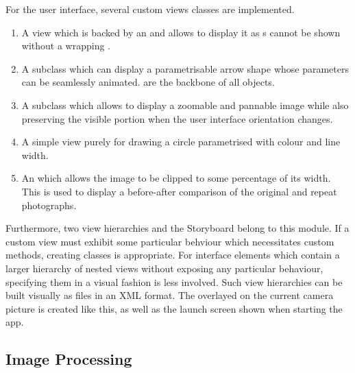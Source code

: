 For the user interface, several custom views classes are implemented.
\begin{enumerate}
   \item {} A view which is backed by an  and
      allows to display it as s cannot be shown without a
      wrapping .
   \item {} A  subclass which can display a
      parametrisable arrow shape whose parameters can be seamlessly animated.
       are the backbone of all  objects.
   \item {} A  subclass which allows to
      display a zoomable and pannable image while also preserving the visible
      portion when the user interface orientation changes.
   \item {} A simple view purely for drawing a circle parametrised
      with colour and line width.
   \item {} An  which allows the
      image to be clipped to some percentage of its width. This is used to
      display a before-after comparison of the original and repeat photographs.
\end{enumerate}

Furthermore, two view hierarchies and the Storyboard belong to this module.  If
a custom view must exhibit some particular behviour which necessitates custom
methods, creating classes is appropriate. For interface elements which contain a
larger hierarchy of nested views without exposing any particular behaviour,
specifying them in a visual fashion is less involved. Such view hierarchies can
be built visually as  files in an XML format. The
 overlayed on the current camera picture is created like
this, as well as the launch screen shown when starting the app.

\subsection{Image Processing}

